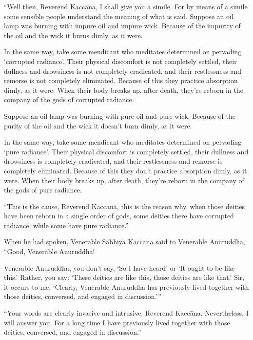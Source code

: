 \documentclass[12pt,openany]{book}%
\begin{document}
“Well then, Reverend \textsanskrit{Kaccāna}, I shall give you a simile. For by means of a simile some sensible people understand the meaning of what is said. Suppose an oil lamp was burning with impure oil and impure wick. Because of the impurity of the oil and the wick it burns dimly, as it were. 

In the same way, take some mendicant who meditates determined on pervading ‘corrupted radiance’. Their physical discomfort is not completely settled, their dullness and drowsiness is not completely eradicated, and their restlessness and remorse is not completely eliminated. Because of this they practice absorption dimly, as it were. When their body breaks up, after death, they’re reborn in the company of the gods of corrupted radiance. 

Suppose an oil lamp was burning with pure oil and pure wick. Because of the purity of the oil and the wick it doesn’t burn dimly, as it were. 

In the same way, take some mendicant who meditates determined on pervading ‘pure radiance’. Their physical discomfort is completely settled, their dullness and drowsiness is completely eradicated, and their restlessness and remorse is completely eliminated. Because of this they don’t practice absorption dimly, as it were. When their body breaks up, after death, they’re reborn in the company of the gods of pure radiance. 

“This is the cause, Reverend \textsanskrit{Kaccāna}, this is the reason why, when those deities have been reborn in a single order of gods, some deities there have corrupted radiance, while some have pure radiance.” 

When he had spoken, Venerable Sabhiya \textsanskrit{Kaccāna} said to Venerable Anuruddha, “Good, Venerable Anuruddha! 

Venerable Anuruddha, you don’t say, ‘So I have heard’ or ‘It ought to be like this.’ Rather, you say: ‘These deities are like this, those deities are like that.’ Sir, it occurs to me, ‘Clearly, Venerable Anuruddha has previously lived together with those deities, conversed, and engaged in discussion.’” 

“Your words are clearly invasive and intrusive, Reverend \textsanskrit{Kaccāna}. Nevertheless, I will answer you. For a long time I have previously lived together with those deities, conversed, and engaged in discussion.” 
\end{document}
